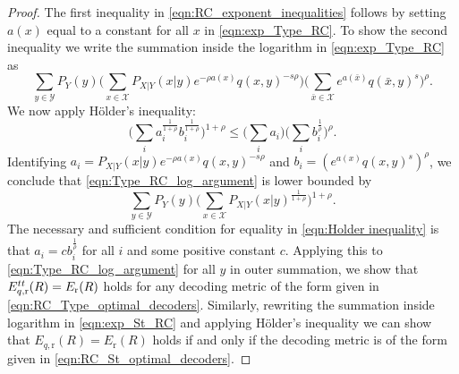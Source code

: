 \documentclass[10pt,a4paper]{amsart}
\newcommand{\AGiF}[1]{\noindent{\textcolor{blue}{\textbf{\#\#\# \small AGiF:} \textsf{\small #1} \#\#\#}}}
\newcommand{\Xc}{\mathcal{X}}
\newcommand{\Yc}{\mathcal{Y}}
\begin{document}
\begin{proof}
	The first inequality in \eqref{eqn:RC_exponent_inequalities} follows by setting $a(x)$ equal to a constant for all $x$ in \eqref{eqn:exp_Type_RC}. To show the second inequality we write the summation inside the logarithm in \eqref{eqn:exp_Type_RC} as
	\begin{equation}
		\sum\limits_{y\in\Yc}P_{Y}(y)\bigg(\sum\limits_{x\in\Xc}P_{X|Y}(x|y)e^{-\rho a(x)}q(x,y)^{-s\rho}\bigg)\bigg(\sum\limits_{\bar{x}\in\Xc}e^{a(\bar{x})}q(\bar{x},y)^s\bigg)^{\rho}.\label{eqn:Type_RC_log_argument}
	\end{equation}
	We now apply H\"older's inequality:
	\begin{equation}
		\bigg(\sum\limits_{i}a_i^{\frac{1}{1+\rho}}b_i^{\frac{1}{1+\rho}}\bigg)^{1+\rho}\leq\bigg(\sum\limits_{i}a_i\bigg)\bigg(\sum\limits_{i}b_i^{\frac{1}{\rho}}\bigg)^{\rho}.\label{eqn:Holder inequality}
	\end{equation}
	Identifying $a_i=P_{X|Y}(x|y)e^{-\rho a(x)}q(x,y)^{-s\rho}$ and $b_i=(e^{a(x)}q(x,y)^s)^{\rho}$, we conclude that \eqref{eqn:Type_RC_log_argument} is lower bounded by
	\begin{equation}
		\sum\limits_{y\in\Yc}P_{Y}(y)\bigg(\sum\limits_{x\in\Xc}P_{X|Y}(x|y)^{\frac{1}{1+\rho}}\bigg)^{1+\rho}.
	\end{equation}
	The necessary and sufficient condition for equality in \eqref{eqn:Holder inequality} is that $a_i=c b_i^{\frac{1}{\rho}}$ for all $i$ and some positive constant $c$. Applying this to \eqref{eqn:Type_RC_log_argument} for all $y$ in outer summation, we show that $E^{\rm tt}_{q,\mathrm{r}}(R)=E_{\mathrm{r}}(R)$ holds for any decoding metric of the form given in \eqref{eqn:RC_Type_optimal_decoders}. Similarly, rewriting the summation inside logarithm in \eqref{eqn:exp_St_RC} and applying H\"older's inequality we can show that $E_{q,\mathrm{r}}(R)=E_{\mathrm{r}}(R)$ holds if and only if the decoding metric is of the form given in \eqref{eqn:RC_St_optimal_decoders}.
\end{proof}
\end{document}
